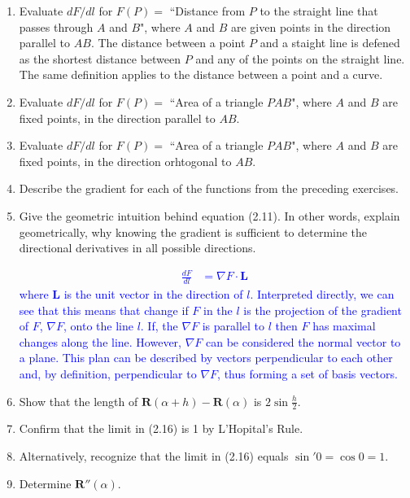 \documentclass[12pt,a4paper]{report}
\newcommand{\BLUE}[1]{\textcolor{blue}{#1}}
\newcommand{\VK}[1]{\textbf{#1}}
\begin{document}
\begin{enumerate}[label=\textbf{\arabic*.}]
\item Evaluate $dF/dl$ for $F(P)=$ ``Distance from $P$ to the straight line that passes through $A$ and $B$", where $A$ and $B$ are given points in the direction parallel to $AB$.  The distance between a point $P$ and a staight line is defened as the shortest distance between $P$ and any of the points on the straight line.  The same definition applies to the distance between a point and a curve.

\item Evaluate $dF/dl$ for $F(P) = $ ``Area of a triangle $PAB$", where $A$ and $B$ are fixed points, in the direction parallel to $AB$.

\item Evaluate $dF/dl$ for $F(P)=$ ``Area of a triangle $PAB$", where $A$ and $B$ are fixed points, in the direction orhtogonal to $AB$.

\item Describe the gradient for each of the functions from the preceding exercises.

\item Give the geometric intuition behind equation (2.11). In other words, explain geometrically, why knowing the gradient is sufficient to determine the directional derivatives in all possible directions.

\BLUE{\begin{align*}
	\frac{dF}{dl} &= \nabla F\cdot \VK{L}
\end{align*}where $\VK{L}$ is the unit vector in the direction of $l$.  Interpreted directly, we can see that this means that change if $F$ in the $l$ is the projection of the gradient of $F$, $\nabla F$, onto the line $l$.  If, the $\nabla F$ is parallel to $l$ then $F$ has maximal changes along the line.  However, $\nabla F$ can be considered the normal vector to a plane.  This plan can be described by vectors perpendicular to each other and, by definition, perpendicular to $\nabla F$, thus forming a set of basis vectors.
}

\item Show that the length of $\VK{R}(\alpha+h)-\VK{R}(\alpha)$ is $2 \sin \frac{h}{2}$.

\item Confirm that the limit in (2.16) is 1 by L'Hopital's Rule.

\item Alternatively, recognize that the limit in (2.16) equals $\sin' 0 = \cos 0 = 1$.

\item Determine $\VK{R}''(\alpha)$.
\end{enumerate}
\end{document}

